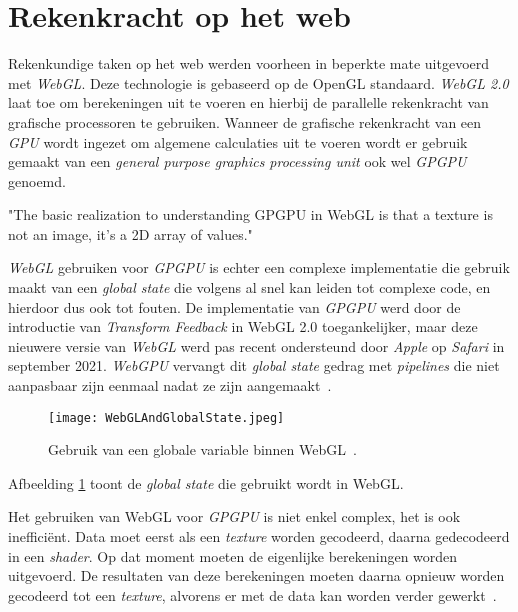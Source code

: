 \section{Rekenkracht op het web}
\label{sec:PowerOnWeb}

Rekenkundige taken op het web werden voorheen in beperkte mate uitgevoerd met \textit{WebGL}. Deze technologie is gebaseerd op de OpenGL standaard. \textit{WebGL 2.0} laat toe om berekeningen uit te voeren en hierbij de parallelle rekenkracht van grafische processoren te gebruiken. Wanneer de grafische rekenkracht van een \textit{GPU} wordt ingezet om algemene calculaties uit te voeren wordt er gebruik gemaakt van een \textit{general purpose graphics processing unit} ook wel \textit{GPGPU} genoemd.

\begin{displayquote}
    "The basic realization to understanding GPGPU in WebGL is that a texture is not an image, it's a 2D array of values."
\end{displayquote}

\textit{WebGL} gebruiken voor \textit{GPGPU} is echter een complexe implementatie die gebruik maakt van een \textit{global state} die volgens \textcite{Surma2022} al snel kan leiden tot complexe code, en hierdoor dus ook tot fouten. De implementatie van \textit{GPGPU} werd door de introductie van \textit{Transform Feedback} in WebGL 2.0 toegankelijker, maar deze nieuwere versie van \textit{WebGL} werd pas recent ondersteund door \textit{Apple} op \textit{Safari} in september 2021. \textit{WebGPU} vervangt dit \textit{global state} gedrag met \textit{pipelines} die niet aanpasbaar zijn eenmaal nadat ze zijn aangemaakt~\autocite{Beaufort2023}.

\begin{figure}
    \texttt{[image: WebGLAndGlobalState.jpeg]}
    \caption[De \textit{Global State} in \textit{WebGL}~\autocite{GFXFundamentals2024}]{Gebruik van een globale variable binnen WebGL~\autocite{GFXFundamentals2024}.}
    \label{fig:WebGL Global State}
\end{figure}

\bigbreak{}

Afbeelding \ref{fig:WebGL Global State} toont de \textit{global state} die gebruikt wordt in WebGL.

\break{}

Het gebruiken van WebGL voor \textit{GPGPU} is niet enkel complex, het is ook inefficiënt. Data moet eerst als een \textit{texture} worden gecodeerd, daarna gedecodeerd in een \textit{shader}. Op dat moment moeten de eigenlijke berekeningen worden uitgevoerd. De resultaten van deze berekeningen moeten daarna opnieuw worden gecodeerd tot een \textit{texture}, alvorens er met de data kan worden verder gewerkt~\autocite{Surma2022}.

